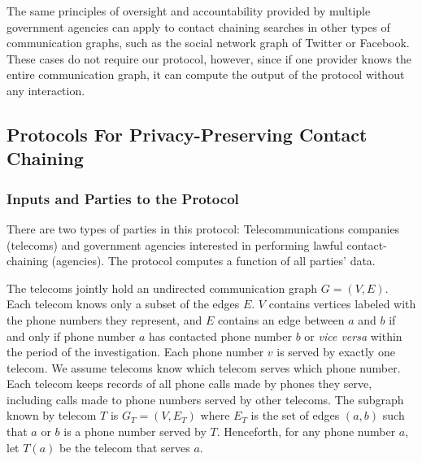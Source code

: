 The same principles of oversight and accountability provided by multiple government agencies can apply to contact chaining searches in other types of communication graphs, such as the social network graph of Twitter or Facebook. These cases do not require our protocol, however, since if one provider knows the entire communication graph, it can compute the output of the protocol without any interaction.

\subsection{Protocols For Privacy-Preserving Contact Chaining}

\label{sec-proto}






\subsubsection{Inputs and Parties to the Protocol}



There are two types of parties in this protocol: Telecommunications companies (telecoms) and government agencies interested in performing lawful contact-chaining (agencies). The protocol computes a function of all parties' data.



The telecoms jointly hold an undirected communication graph $G=(V,E)$. Each telecom knows only a subset of the edges $E$. $V$ contains vertices labeled with the phone numbers they represent, and $E$ contains an edge between $a$ and $b$ if and only if phone number $a$ has contacted phone number $b$ or {\it vice versa} within the period of the investigation. Each phone number $v$ is served by exactly one telecom. We assume telecoms know which telecom serves which phone number. Each telecom keeps records of all phone calls made by phones they serve, including calls made to phone numbers served by other telecoms. The subgraph known by telecom $T$ is $G_T=(V, E_T)$ where $E_T$ is the set of edges $(a, b)$ such that $a$ or $b$ is a phone number served by $T$. Henceforth, for any phone number $a$, let $T(a)$ be the telecom that serves $a$.



